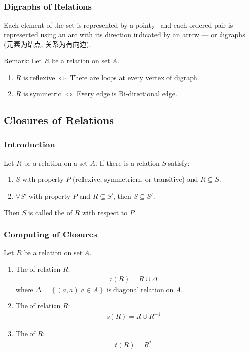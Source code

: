 \subsubsection{Digraphs of Relations}
Each element of the set is represented by a point， and each ordered pair is represented using an arc with its direction indicated by an arrow ---  or digraphs (元素为结点, 关系为有向边).

Remark: Let $R$ be a relation on set $A$. 
\begin{enumerate}
    \item $R$ is reflexive $\Leftrightarrow$ There are loops at every vertex of digraph. 
    \item $R$ is symmetric $\Leftrightarrow$ Every edge is Bi-directional edge. 
\end{enumerate}

\subsection{Closures of Relations}
\subsubsection{Introduction}
\begin{definition}
    Let $R$ be a relation on a set $A$. If there is a relation $S$ satisfy:
    \begin{enumerate}
        \item $S$ with property $P$ (reflexive, symmetricm, or transitive) and $R\subseteq S$. 
        \item $\forall S'$ with property $P$ and $R\subseteq S'$, then $S\subseteq S'$.
    \end{enumerate}
    Then $S$ is called the  of $R$ with respect to $P$. 
\end{definition}

\subsubsection{Computing of Closures}
\begin{theorem}
    Let $R$ be a relation on set $A$. 
    \begin{enumerate}
        \item The  of relation $R$:
        \begin{align*}
            r(R)=R\cup \Delta
        \end{align*}
        where $\Delta=\left\{ (a,a) | a\in A \right\}$ is diagonal relation on $A$. 
        \item The  of relation $R$: 
        \begin{align*}
            s(R)=R\cup R^{-1}
        \end{align*}
        \item The  of $R$:
        \begin{align*}
            t(R)=R^*
        \end{align*}
    \end{enumerate}
\end{theorem}

